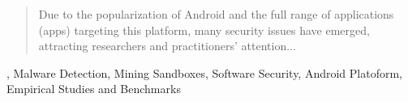 \begin{abstract}
Due to the popularization of Android and the full range of applications (apps) targeting this platform, many security issues have emerged, attracting researchers and practitioners' attention... 
\end{abstract}

\begin{IEEEkeywords}
\droidxp, Malware Detection,
Mining Sandboxes,
Software Security,
Android Platoform,
Empirical Studies and Benchmarks
\end{IEEEkeywords}